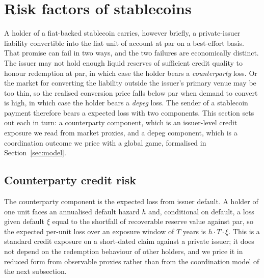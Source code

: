 \section{Risk factors of stablecoins}\label{sec:risk_factors}

A holder of a fiat-backed stablecoin carries, however briefly, a private-issuer liability convertible into the fiat unit of account at par on a best-effort basis. That promise can fail in two ways, and the two failures are economically distinct. The issuer may not hold enough liquid reserves of sufficient credit quality to honour redemption at par, in which case the holder bears a \emph{counterparty} loss. Or the market for converting the liability outside the issuer's primary venue may be too thin, so the realised conversion price falls below par when demand to convert is high, in which case the holder bears a \emph{depeg} loss. The sender of a stablecoin payment therefore bears a expected loss with two components. This section sets out each in turn: a counterparty component, which is an issuer-level credit exposure we read from market proxies, and a depeg component, which is a coordination outcome we price with a global game, formalised in Section~\ref{sec:model}.

\subsection{Counterparty credit risk}\label{sub:counterparty}

The counterparty component is the expected loss from issuer default. A holder of one unit faces an annualised default hazard $h$ and, conditional on default, a loss given default $\xi$ equal to the shortfall of recoverable reserve value against par, so the expected per-unit loss over an exposure window of $T$ years is $h \cdot T \cdot \xi$. This is a standard credit exposure on a short-dated claim against a private issuer; it does not depend on the redemption behaviour of other holders, and we price it in reduced form from observable proxies rather than from the coordination model of the next subsection.

